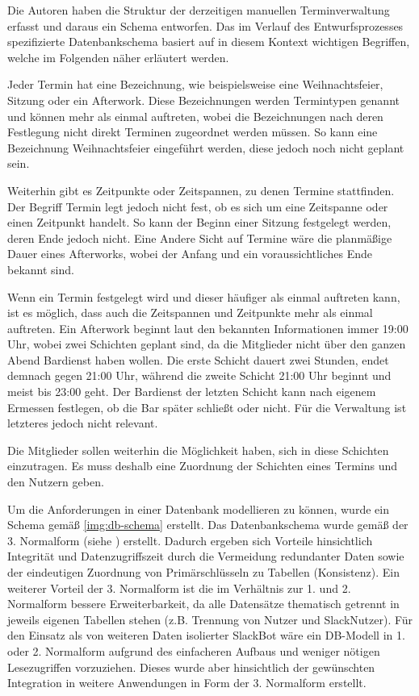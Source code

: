 Die Autoren haben die Struktur der derzeitigen manuellen Terminverwaltung erfasst und daraus ein Schema entworfen. 
Das im Verlauf des Entwurfsprozesses spezifizierte Datenbankschema basiert auf in diesem Kontext wichtigen Begriffen, welche im Folgenden näher erläutert werden.

Jeder Termin hat eine Bezeichnung, wie beispielsweise eine Weihnachtsfeier, Sitzung oder ein Afterwork. Diese Bezeichnungen werden Termintypen genannt und können mehr als einmal auftreten, wobei die Bezeichnungen nach deren Festlegung nicht direkt Terminen zugeordnet werden müssen. So kann eine Bezeichnung Weihnachtsfeier eingeführt werden, diese jedoch noch nicht geplant sein.

Weiterhin gibt es Zeitpunkte oder Zeitspannen, zu denen Termine stattfinden. Der Begriff Termin legt jedoch nicht fest, ob es sich um eine Zeitspanne oder einen Zeitpunkt handelt. So kann der Beginn einer Sitzung festgelegt werden, deren Ende jedoch nicht. Eine Andere Sicht auf Termine wäre die planmäßige Dauer eines Afterworks, wobei der Anfang und ein voraussichtliches Ende bekannt sind.

Wenn ein Termin festgelegt wird und dieser häufiger als einmal auftreten kann, ist es möglich, dass auch die Zeitspannen und Zeitpunkte mehr als einmal auftreten. Ein Afterwork beginnt laut den bekannten Informationen immer 19:00 Uhr, wobei zwei Schichten geplant sind, da die Mitglieder nicht über den ganzen Abend Bardienst haben wollen. Die erste Schicht dauert zwei Stunden, endet demnach gegen 21:00 Uhr, während die zweite Schicht 21:00 Uhr beginnt und meist bis 23:00 geht. Der Bardienst der letzten Schicht kann nach eigenem Ermessen festlegen, ob die Bar später schließt oder nicht. Für die Verwaltung ist letzteres jedoch nicht relevant.

Die Mitglieder sollen weiterhin die Möglichkeit haben, sich in diese Schichten einzutragen. Es muss deshalb eine Zuordnung der Schichten eines Termins und den Nutzern geben. 


Um die Anforderungen in einer Datenbank modellieren zu können, wurde ein Schema gemäß \autoref{img:db-schema} erstellt. Das Datenbankschema wurde gemäß der 3. Normalform (siehe \cite{CoddRelationalModelData1970}) erstellt. Dadurch ergeben sich Vorteile hinsichtlich Integrität und Datenzugriffszeit durch die Vermeidung redundanter Daten sowie der eindeutigen Zuordnung von Primärschlüsseln zu Tabellen (Konsistenz). Ein weiterer Vorteil der 3. Normalform ist die im Verhältnis zur 1. und 2. Normalform bessere Erweiterbarkeit, da alle Datensätze thematisch getrennt in jeweils eigenen Tabellen stehen (z.B. Trennung von Nutzer und SlackNutzer). 
Für den Einsatz als von weiteren Daten isolierter SlackBot wäre ein DB-Modell in 1. oder 2. Normalform aufgrund des einfacheren Aufbaus und weniger nötigen Lesezugriffen vorzuziehen. Dieses wurde aber hinsichtlich der gewünschten Integration in weitere Anwendungen in Form der 3. Normalform erstellt.

